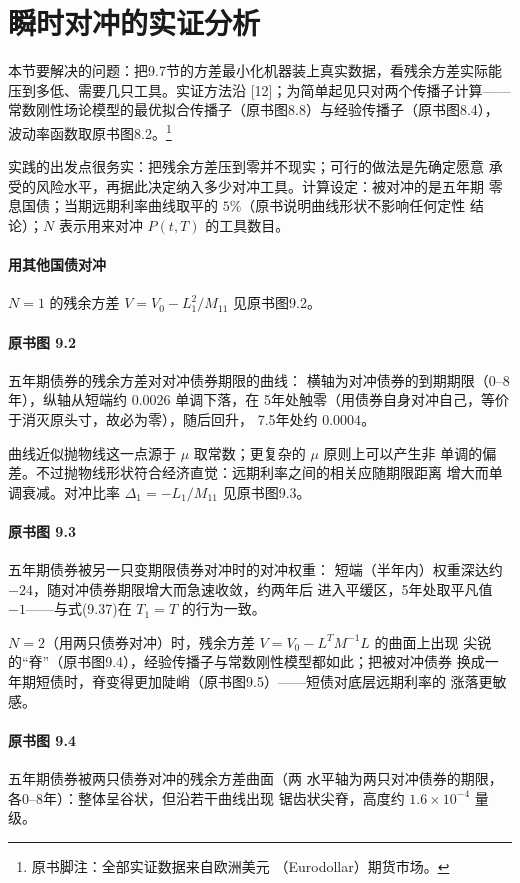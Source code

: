 \section{瞬时对冲的实证分析}

本节要解决的问题：把9.7节的方差最小化机器装上真实数据，看残余方差实际能
压到多低、需要几只工具。实证方法沿 [12]；为简单起见只对两个传播子计算——
常数刚性场论模型的最优拟合传播子（原书图8.8）与经验传播子（原书图8.4），
波动率函数取原书图8.2。\footnote{原书脚注：全部实证数据来自欧洲美元
（Eurodollar）期货市场。}

实践的出发点很务实：把残余方差压到零并不现实；可行的做法是先确定愿意
承受的风险水平，再据此决定纳入多少对冲工具。计算设定：被对冲的是五年期
零息国债；当期远期利率曲线取平的 $5\%$（原书说明曲线形状不影响任何定性
结论）；$N$ 表示用来对冲 $P(t,T)$ 的工具数目。

\paragraph{用其他国债对冲}
$N=1$ 的残余方差 $V=V_0-L_1^{2}/M_{11}$ 见原书图9.2。

\paragraph{原书图 9.2}\quad 五年期债券的残余方差对对冲债券期限的曲线：
横轴为对冲债券的到期期限（0--8年），纵轴从短端约 $0.0026$ 单调下落，在
5年处触零（用债券自身对冲自己，等价于消灭原头寸，故必为零），随后回升，
7.5年处约 $0.0004$。

曲线近似抛物线这一点源于 $\mu$ 取常数；更复杂的 $\mu$ 原则上可以产生非
单调的偏差。不过抛物线形状符合经济直觉：远期利率之间的相关应随期限距离
增大而单调衰减。对冲比率 $\Delta_1=-L_1/M_{11}$ 见原书图9.3。

\paragraph{原书图 9.3}\quad 五年期债券被另一只变期限债券对冲时的对冲权重：
短端（半年内）权重深达约 $-24$，随对冲债券期限增大而急速收敛，约两年后
进入平缓区，5年处取平凡值 $-1$——与式(9.37)在 $T_1=T$ 的行为一致。

$N=2$（用两只债券对冲）时，残余方差 $V=V_0-L^{T}M^{-1}L$ 的曲面上出现
尖锐的“脊”（原书图9.4），经验传播子与常数刚性模型都如此；把被对冲债券
换成一年期短债时，脊变得更加陡峭（原书图9.5）——短债对底层远期利率的
涨落更敏感。

\paragraph{原书图 9.4}\quad 五年期债券被两只债券对冲的残余方差曲面（两
水平轴为两只对冲债券的期限，各0--8年）：整体呈谷状，但沿若干曲线出现
锯齿状尖脊，高度约 $1.6\times10^{-4}$ 量级。

